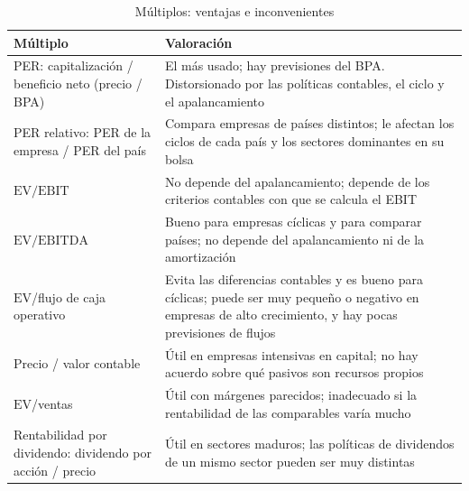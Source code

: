 \documentclass[11pt]{article}
\begin{document}
\begin{table}[H]
\centering
\caption{Múltiplos: ventajas e inconvenientes}\label{tab:multiplos-ventajas}
\begin{tabular}{>{\raggedright\arraybackslash}m{3.6cm}>{\raggedright\arraybackslash}m{10.2cm}}
\toprule
\rowcolor{tceeazulpalido}\textbf{Múltiplo} & \textbf{Valoración} \\
\midrule
PER: capitalización / beneficio neto (precio / BPA) & El más usado; hay previsiones del BPA. Distorsionado por las políticas contables, el ciclo y el apalancamiento \\
PER relativo: PER de la empresa / PER del país & Compara empresas de países distintos; le afectan los ciclos de cada país y los sectores dominantes en su bolsa \\
$\mathrm{EV}/\mathrm{EBIT}$ & No depende del apalancamiento; depende de los criterios contables con que se calcula el EBIT \\
$\mathrm{EV}/\mathrm{EBITDA}$ & Bueno para empresas cíclicas y para comparar países; no depende del apalancamiento ni de la amortización \\
$\mathrm{EV}$/flujo de caja operativo & Evita las diferencias contables y es bueno para cíclicas; puede ser muy pequeño o negativo en empresas de alto crecimiento, y hay pocas previsiones de flujos \\
Precio / valor contable & Útil en empresas intensivas en capital; no hay acuerdo sobre qué pasivos son recursos propios \\
$\mathrm{EV}$/ventas & Útil con márgenes parecidos; inadecuado si la rentabilidad de las comparables varía mucho \\
Rentabilidad por dividendo: dividendo por acción / precio & Útil en sectores maduros; las políticas de dividendos de un mismo sector pueden ser muy distintas \\
\bottomrule
\end{tabular}
\end{table}
\end{document}
